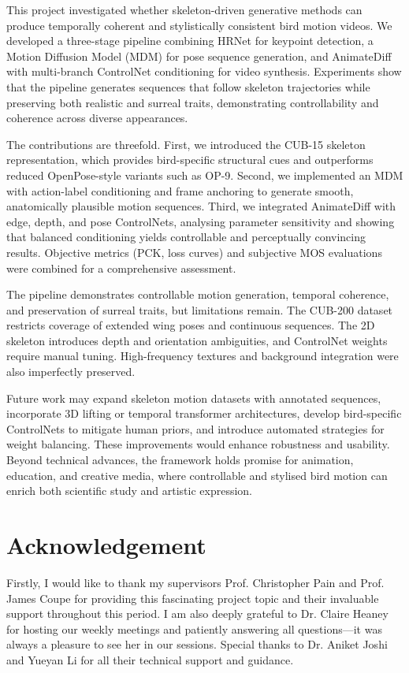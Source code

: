 \documentclass[final-report]{report-template}
\begin{document}
This project investigated whether skeleton-driven generative methods can produce temporally coherent and stylistically consistent bird motion videos. We developed a three-stage pipeline combining HRNet for keypoint detection, a Motion Diffusion Model (MDM) for pose sequence generation, and AnimateDiff with multi-branch ControlNet conditioning for video synthesis. Experiments show that the pipeline generates sequences that follow skeleton trajectories while preserving both realistic and surreal traits, demonstrating controllability and coherence across diverse appearances.

The contributions are threefold. First, we introduced the CUB-15 skeleton representation, which provides bird-specific structural cues and outperforms reduced OpenPose-style variants such as OP-9. Second, we implemented an MDM with action-label conditioning and frame anchoring to generate smooth, anatomically plausible motion sequences. Third, we integrated AnimateDiff with edge, depth, and pose ControlNets, analysing parameter sensitivity and showing that balanced conditioning yields controllable and perceptually convincing results. Objective metrics (PCK, loss curves) and subjective MOS evaluations were combined for a comprehensive assessment.

The pipeline demonstrates controllable motion generation, temporal coherence, and preservation of surreal traits, but limitations remain. The CUB-200 dataset restricts coverage of extended wing poses and continuous sequences. The 2D skeleton introduces depth and orientation ambiguities, and ControlNet weights require manual tuning. High-frequency textures and background integration were also imperfectly preserved.

Future work may expand skeleton motion datasets with annotated sequences, incorporate 3D lifting or temporal transformer architectures, develop bird-specific ControlNets to mitigate human priors, and introduce automated strategies for weight balancing. These improvements would enhance robustness and usability. Beyond technical advances, the framework holds promise for animation, education, and creative media, where controllable and stylised bird motion can enrich both scientific study and artistic expression.


\section*{Acknowledgement}
Firstly, I would like to thank my supervisors Prof. Christopher Pain and Prof. James Coupe for providing this fascinating project topic and their invaluable support throughout this period. I am also deeply grateful to Dr. Claire Heaney for hosting our weekly meetings and patiently answering all questions—it was always a pleasure to see her in our sessions. Special thanks to Dr. Aniket Joshi and Yueyan Li for all their technical support and guidance.
\end{document}
